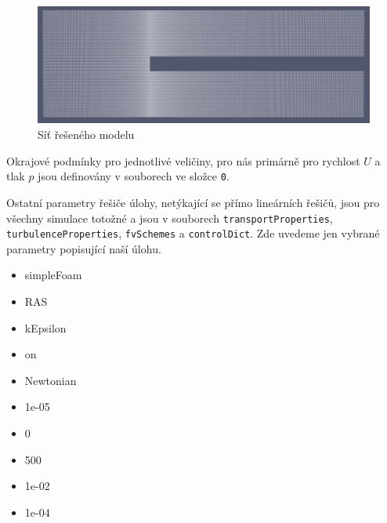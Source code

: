\documentclass[a4paper,12pt]{report}
\theoremstyle{remark}
\begin{document}
\begin{figure}[H]
	\centering
	\includegraphics[width=1\linewidth]{pv-mesh.png}
	\caption{Síť řešeného modelu}
	\label{fig:pvmesh}
\end{figure}


Okrajové podmínky pro jednotlivé veličiny, pro nás primárně pro rychlost $U$ a tlak $p$  jsou definovány v souborech ve složce \texttt{0}.

Ostatní parametry řešiče úlohy, netýkající se přímo lineárních řešičů, jsou pro všechny simulace totožné a jsou v souborech \texttt{transportProperties}, \texttt{turbulenceProperties}, \texttt{fvSchemes} a \texttt{controlDict}. Zde uvedeme jen vybrané parametry popisující naší úlohu.

\begin{itemize}
	\item{simpleFoam}
	\item{RAS}
	\item{kEpsilon}
	\item{on}
	\item{Newtonian}
	\item{1e-05}
	\item{0}
	\item{500}		
	\item{1e-02}
	\item{1e-04}
\end{itemize}
	
\end{document}
